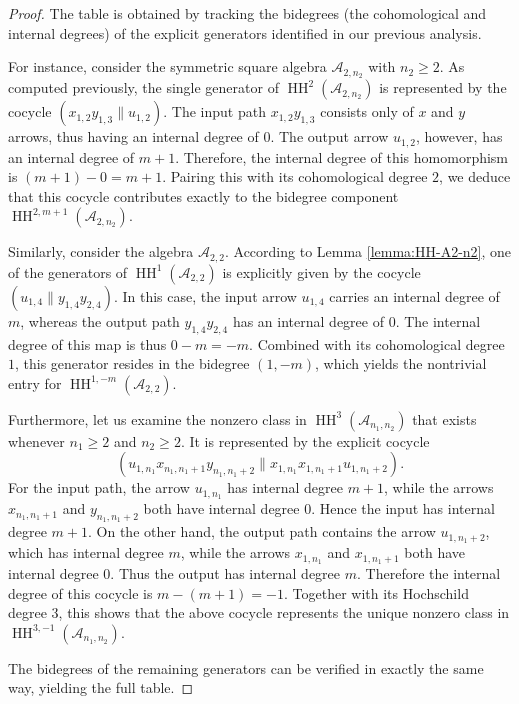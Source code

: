 \documentclass[a4paper, reqno, 11pt]{amsart}
\theoremstyle{definition}
\begin{document}
\begin{proof}
	The table is obtained by tracking the bidegrees (the cohomological and internal degrees) of the explicit generators identified in our previous analysis.
	
	For instance, consider the symmetric square algebra $\mathcal{A}_{2,n_2}$ with $n_2 \ge 2$. As computed previously, the single generator of $\operatorname{HH}^2(\mathcal{A}_{2,n_2})$ is represented by the cocycle $(x_{1,2}y_{1,3} \parallel u_{1,2})$. The input path $x_{1,2}y_{1,3}$ consists only of $x$ and $y$ arrows, thus having an internal degree of $0$. The output arrow $u_{1,2}$, however, has an internal degree of $m+1$. Therefore, the internal degree of this homomorphism is $(m+1) - 0 = m+1$. Pairing this with its cohomological degree $2$, we deduce that this cocycle contributes exactly to the bidegree component $\operatorname{HH}^{2,m+1}(\mathcal{A}_{2,n_2})$. 
	
	Similarly, consider the algebra $\mathcal{A}_{2,2}$. According to Lemma \ref{lemma:HH-A2-n2}, one of the generators of $\operatorname{HH}^1(\mathcal{A}_{2,2})$ is explicitly given by the cocycle $(u_{1,4} \parallel y_{1,4}y_{2,4})$. In this case, the input arrow $u_{1,4}$ carries an internal degree of $m$, whereas the output path $y_{1,4}y_{2,4}$ has an internal degree of $0$. The internal degree of this map is thus $0 - m = -m$. Combined with its cohomological degree $1$, this generator resides in the bidegree $(1,-m)$, which yields the nontrivial entry for $\operatorname{HH}^{1,-m}(\mathcal{A}_{2,2})$.
	
	Furthermore, let us examine the nonzero class in \(\operatorname{HH}^3(\mathcal A_{n_1,n_2})\) that exists whenever \(n_1\geq 2\) and \(n_2\geq 2\). It is represented by the explicit cocycle
	\[
	(u_{1,n_1}x_{n_1,n_1+1}y_{n_1,n_1+2}
	\parallel
	x_{1,n_1}x_{1,n_1+1}u_{1,n_1+2}).
	\]
	For the input path, the arrow \(u_{1,n_1}\) has internal degree \(m+1\), while the arrows \(x_{n_1,n_1+1}\) and \(y_{n_1,n_1+2}\) both have internal degree \(0\). Hence the input has internal degree \(m+1\). On the other hand, the output path contains the arrow \(u_{1,n_1+2}\), which has internal degree \(m\), while the arrows \(x_{1,n_1}\) and \(x_{1,n_1+1}\) both have internal degree \(0\). Thus the output has internal degree \(m\). Therefore the internal degree of this cocycle is $m-(m+1)=-1.$
	Together with its Hochschild degree \(3\), this shows that the above cocycle represents the unique nonzero class in $\operatorname{HH}^{3,-1}(\mathcal A_{n_1,n_2}).$
	
	
	The bidegrees of the remaining generators can be verified in exactly the same way, yielding the full table.
\end{proof}
\end{document}
